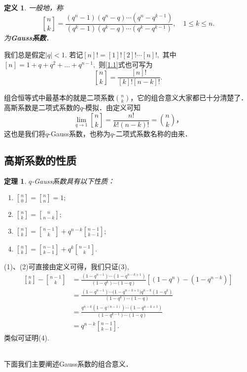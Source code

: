 \documentclass[a4paper,12pt]{ctexart}
\newtheorem{theo}{定理}[section]
\newtheorem{defi}{定义}[section]
\begin{document}
\begin{defi}
一般地，称
\begin{equation}\label{1.1}
{n\brack
k}=\frac{(q^n-1)(q^n-q)\cdots(q^n-q^{k-1})}{(q^k-1)(q^k-q)\cdots(q^k-q^{k-1})},\quad
1\leq k\leq n.
\end{equation}
为{\bf Gauss系数}．
\end{defi}

我们总是假定$|q|<1$. 若记$[n]!=[1]![2]!\cdots[n]!,$
其中$[n]=1+q+q^2+\ldots+q^{n-1},$ 则\eqref{1.1}式也可写为
$${n\brack k}=\frac{[n]!}{[k]![n-k]!}.$$


组合恒等式中最基本的就是二项系数$n \choose k$，它的组合意义大家都已十分清楚了．高斯系数是二项式系数的$q$-模拟．由定义可知
$$\displaystyle\lim_{q\rightarrow 1}{n\brack k}=\frac{n!}{k!(n-k)!}={n\choose
k}，$$
这也是我们将$q$-Gauss系数，也称为$q$-二项式系数名称的由来．
\\[3pt]

\subsection{高斯系数的性质}
\begin{theo}
$q$-Gauss系数具有以下性质：
\begin{enumerate}
\item
$\displaystyle{n\brack 0}={n\brack n}=1; $
\item
$\displaystyle{n\brack k}={n\brack {n-k}};$
\item
$\displaystyle{n\brack k}={n-1\brack k}+q^{n-k}{n-1\brack{k-1}};$
\item
$\displaystyle{n\brack k}={n-1\brack{k-1}}+q^k{n-1\brack k}.$
\end{enumerate}
\end{theo}

\begin{pf}
(1)、(2)可直接由定义可得，我们只证(3),
\begin{align*}
{n\brack k}-{n-1\brack
k}&={\frac{(1-q^{n-1})\cdots{(1-q^{n-k+1})}}{(1-q^k)\cdots(1-q)}}[(1-q^n)-(1-q^{n-k})]\\&={\frac{(1-q^{n-1})\cdots{(1-q^{n-k+1}})q^{n-k}(1-q^k)}{(1-q^k)\cdots(1-q)}}\\
&=\frac{q^{n-k}(1-q^(n-1))\cdots(1-q^{n-k+1})}{(1-q^{k-1})\cdots(1-q)}\\
&=q^{n-k}{n-1\brack{k-1}}.
\end{align*}
类似可证明(4).
\end{pf}\\[15pt]
下面我们主要阐述Gauss系数的组合意义．\\[5pt]
\end{document}
